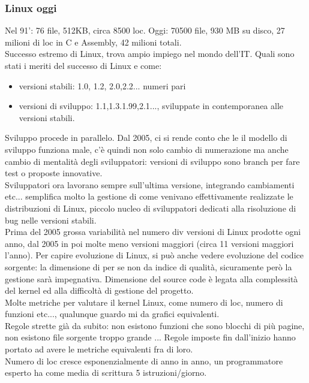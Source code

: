 \documentclass{article}
\begin{document}
\subsubsection{Linux oggi}
Nel 91': 76 file, 512KB, circa 8500 loc. Oggi: 70500 file, 930 MB su disco, 27 milioni di loc in C e Assembly, 42 milioni totali.\\ Successo estremo di Linux, trova ampio impiego nel mondo dell'IT. Quali sono stati i meriti del successo di Linux e come:
\begin{itemize}
\item versioni stabili: 1.0, 1.2, 2.0,2.2... numeri pari
\item  versioni di sviluppo: 1.1,1.3.1.99,2.1..., sviluppate in contemporanea alle versioni stabili.
\end{itemize}
Sviluppo procede in parallelo. Dal 2005, ci si rende conto che le il modello di sviluppo funziona male, c'è quindi non solo cambio di numerazione ma anche cambio di mentalità degli sviluppatori: versioni di sviluppo sono branch per fare test o proposte innovative.\\ Sviluppatori ora lavorano sempre sull'ultima versione, integrando cambiamenti etc... semplifica molto la gestione di come venivano effettivamente realizzate le distribuzioni di Linux, piccolo nucleo di sviluppatori dedicati alla risoluzione di bug nelle versioni stabili.\\ Prima del 2005 grossa variabilità nel numero div versioni di Linux prodotte ogni anno, dal 2005 in poi molte meno versioni maggiori (circa 11 versioni maggiori l'anno). Per capire evoluzione di Linux, si può anche vedere evoluzione del codice sorgente: la dimensione di per se non da indice di qualità, sicuramente però la gestione sarà impegnativa. Dimensione del source code è legata alla complessità del kernel ed alla difficoltà di gestione del progetto.\\ Molte metriche per valutare il kernel Linux, come numero di loc, numero di funzioni etc..., qualunque guardo mi da grafici equivalenti.\\ Regole strette già da subito: non esistono funzioni che sono blocchi di più pagine, non esistono file sorgente troppo grande ... Regole imposte fin dall'inizio hanno portato ad avere le metriche equivalenti fra di loro.\\ Numero di loc cresce esponenzialmente di anno in anno, un programmatore esperto ha come media di scrittura 5 istruzioni/giorno.
\end{document}
